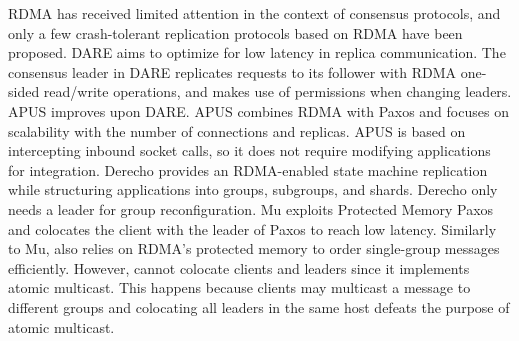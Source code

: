 RDMA has received limited attention in the context of consensus
protocols, and only a few crash-tolerant replication protocols based on RDMA 
have been proposed. DARE \cite{DARE} aims to optimize for low latency in replica
communication. The consensus leader in DARE replicates requests to its follower
with RDMA one-sided read/write operations, and makes use of permissions when
changing leaders. APUS \cite{APUS} improves upon DARE. APUS
combines RDMA with Paxos and focuses on scalability with the number of
connections and replicas. APUS is based on intercepting inbound socket calls, so
it does not require modifying applications for integration. Derecho
\cite{jha2019derecho} provides an RDMA-enabled state machine replication while
structuring applications into groups, subgroups, and shards. Derecho only needs
a leader for group reconfiguration. 
Mu \cite{Mu} exploits Protected Memory Paxos and colocates the client with the leader of Paxos to reach low latency.
Similarly to Mu, \libname also relies on RDMA's protected memory to order single-group messages efficiently.
However, \libname cannot colocate clients and leaders since it implements atomic multicast.
This happens because clients may multicast a message to different groups and colocating all leaders in the same host defeats the purpose of atomic multicast.






